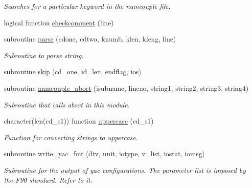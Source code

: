 \begin{DoxyCompactItemize}
\begin{DoxyCompactList}\small\item\em Searches for a particular keyword in the namcouple file. \end{DoxyCompactList}\item 
logical function \hyperlink{namespacemod__oasis__namcouple_a4551fbe4bcd69bc6d0d4f6e1ee52ea86}{checkcomment} (line)
\item 
subroutine \hyperlink{namespacemod__oasis__namcouple_a743cf58ab4240aca9ed3e0e2bf1b873c}{parse} (cdone, cdtwo, knumb, klen, kleng, line)
\begin{DoxyCompactList}\small\item\em Subroutine to parse string. \end{DoxyCompactList}\item 
subroutine \hyperlink{namespacemod__oasis__namcouple_a951e3cbd0a1f031399779b6ab3a52112}{skip} (cd\+\_\+one, id\+\_\+len, endflag, ios)
\item 
subroutine \hyperlink{namespacemod__oasis__namcouple_aefebb1d6fd8ac62ea91f9e03265440a3}{namcouple\+\_\+abort} (isubname, lineno, string1, string2, string3, string4)
\begin{DoxyCompactList}\small\item\em Subroutine that calls abort in this module. \end{DoxyCompactList}\item 
character(len(cd\+\_\+s1)) function \hyperlink{namespacemod__oasis__namcouple_a14ea756ea43e135e67ee706e48fbf780}{uppercase} (cd\+\_\+s1)
\begin{DoxyCompactList}\small\item\em Function for converting strings to uppercase. \end{DoxyCompactList}\item 
subroutine \hyperlink{namespacemod__oasis__namcouple_a72b54d7a959dad1e6c65e9381baa48bf}{write\+\_\+yac\+\_\+fmt} (dtv, unit, iotype, v\+\_\+list, iostat, iomsg)
\begin{DoxyCompactList}\small\item\em Subroutine for the output of yac configurations. The parameter list is imposed by the F90 standard. Refer to it. \end{DoxyCompactList}\end{DoxyCompactItemize}
